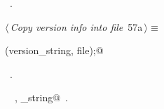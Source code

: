 \documentclass[a4paper]{report}
\begin{document}
\begin{flushleft}
\begin{minipage}{\linewidth}
\begin{list}{}{}
\mbox{}\verb@          /* ignore these since pass1 will have warned about them */@\\
\mbox{}\verb@              break;@\\
\mbox{}\verb@  }@\\
\mbox{}\verb@}@{\NWsep}
\end{list}
\vspace{-1.5ex}
\footnotesize
\begin{list}{}{\setlength{\itemsep}{-\parsep}\setlength{\itemindent}{-\leftmargin}}
\item \NWtxtMacroRefIn\ .

\item{}
\end{list}
\end{minipage}\vspace{4ex}
\end{flushleft}
\begin{flushleft} \small
\begin{minipage}{\linewidth}\label{scrap109}\raggedright\small
{} $\langle\,${\it Copy version info into file}\nobreak\ {\footnotesize {57a}}$\,\rangle\equiv$
\vspace{-1ex}
\begin{list}{}{} \item
\mbox{}\verb@fputs(version_string, file);@\\
\mbox{}\verb@@{\NWsep}
\end{list}
\vspace{-1.5ex}
\footnotesize
\begin{list}{}{\setlength{\itemsep}{-\parsep}\setlength{\itemindent}{-\leftmargin}}
\item \NWtxtMacroRefIn\ .
\item \NWtxtIdentsUsed\nobreak\  \verb@fputs@\nobreak\ , \verb@version_string@\nobreak\ .
\item{}
\end{list}
\end{minipage}\vspace{4ex}
\end{flushleft}
\end{document}
